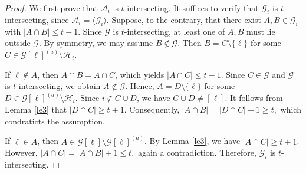 \documentclass[11pt]{article}
\begin{document}
\begin{proof}
We first prove that $\mathcal{A}_i$  is $t$-intersecting. It suffices to verify that $\mathcal{G}_i$ is $t$-intersecting, since $\mathcal{A}_i = \langle \mathcal{G}_i \rangle$. Suppose, to the contrary, that there exist $A, B \in \mathcal{G}_i$ with $|A \cap B| \le t-1$. Since $\mathcal{G}$ is $t$-intersecting, at least one of $A, B$ must lie outside $\mathcal{G}$. By symmetry, we may assume $B \notin \mathcal{G}$. Then $B = C \setminus \{\ell\}$ for some $C \in \mathcal{G}[\ell]^{(a)}\setminus \mathcal{H}_{i}$.

If $\ell \notin A$, then $A \cap B = A \cap C$, which yields $|A \cap C| \le t-1$. Since $C \in \mathcal{G}$ and $\mathcal{G}$ is $t$-intersecting, we obtain $A \notin \mathcal{G}$. Hence, $A = D \setminus \{\ell\}$ for some $D \in \mathcal{G}[\ell]^{(a)}\setminus \mathcal{H}_{i}$. Since $i\notin C\cup D$, we have $C\cup D\neq [\ell]$. 
It follows from Lemma \ref{le3} that $|D \cap C| \geq t+1$. Consequently,
$
|A \cap B| = |D \cap C| - 1 \ge t,
$
which condraticts the assumption.

If $\ell \in A$, then $A \in \mathcal{G}[\ell] \setminus \mathcal{G}[\ell]^{(a)}$. By Lemma \ref{le3}, we have $|A \cap C| \geq t+1$. However,
$
|A \cap C| = |A \cap B| + 1 \le t,
$
again a contradiction.
Therefore, $\mathcal{G}_i$ is $t$-intersecting. 


\end{proof}
\end{document}
